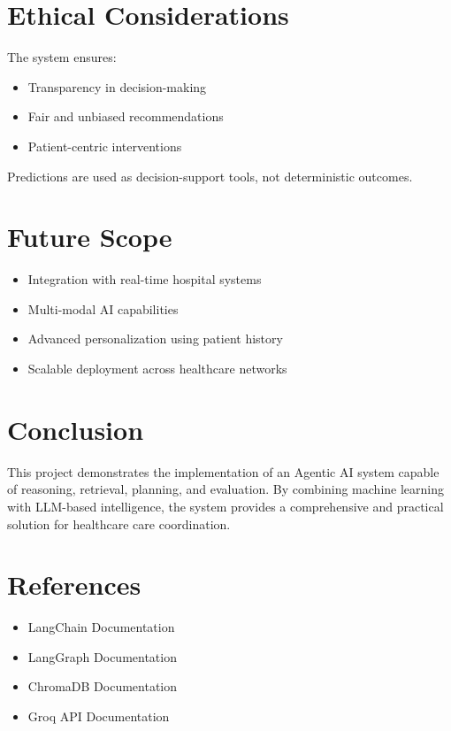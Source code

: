 \documentclass[12pt]{article}
\begin{document}

\section{Ethical Considerations}
The system ensures:
\begin{itemize}
    \item Transparency in decision-making
    \item Fair and unbiased recommendations
    \item Patient-centric interventions
\end{itemize}

Predictions are used as decision-support tools, not deterministic outcomes.


\section{Future Scope}
\begin{itemize}
    \item Integration with real-time hospital systems
    \item Multi-modal AI capabilities
    \item Advanced personalization using patient history
    \item Scalable deployment across healthcare networks
\end{itemize}


\section{Conclusion}
This project demonstrates the implementation of an Agentic AI system capable of reasoning, retrieval, planning, and evaluation. By combining machine learning with LLM-based intelligence, the system provides a comprehensive and practical solution for healthcare care coordination.


\section{References}
\begin{itemize}
    \item LangChain Documentation
    \item LangGraph Documentation
    \item ChromaDB Documentation
    \item Groq API Documentation
\end{itemize}
\end{document}
